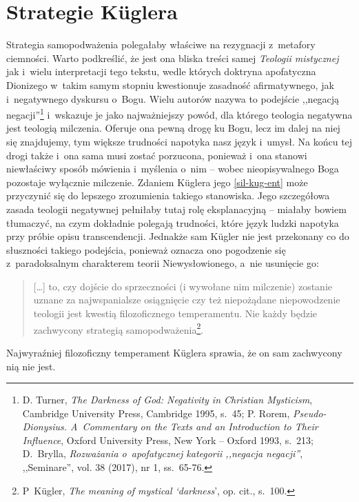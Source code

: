 \section{Strategie Küglera}

Strategia samopodważenia polegałaby właściwe na rezygnacji z~metafory ciemności. Warto podkreślić, że jest ona bliska treści samej \textit{Teologii mistycznej} jak i~wielu interpretacji tego tekstu, wedle których doktryna apofatyczna Dionizego w~takim samym stopniu kwestionuje zasadność afirmatywnego, jak i~negatywnego dyskursu o~Bogu. Wielu autorów nazywa to podejście ,,negacją negacji''\footnote{D. Turner, \textit{The Darkness of God: Negativity in Christian Mysticism}, Cambridge University Press, Cambridge 1995, s.~45; P. Rorem, \textit{Pseudo-Dionysius. A~Commentary on the Texts and an Introduction to Their Influence}, Oxford University Press, New York -- Oxford 1993, s.~213; D.~Brylla, \textit{Rozważania o~apofatycznej kategorii ,,negacja negacji''}, ,,Seminare'', vol. 38 (2017), nr 1, ss.~65-76.} i~wskazuje je jako najważniejszy powód, dla którego teologia negatywna jest teologią milczenia. Oferuje ona pewną drogę ku Bogu, lecz im dalej na niej się znajdujemy, tym większe trudności napotyka nasz język i~umysł. Na końcu tej drogi także i~ona sama musi zostać porzucona, ponieważ i~ona stanowi niewłaściwy sposób mówienia i~myślenia o~nim -- wobec nieopisywalnego Boga pozostaje wyłącznie milczenie. Zdaniem Küglera jego \ref{sil-kug-ent} może przyczynić się do lepszego zrozumienia takiego stanowiska. Jego szczegółowa zasada teologii negatywnej pełniłaby tutaj rolę eksplanacyjną -- miałaby bowiem tłumaczyć, na czym dokładnie polegają trudności, które język ludzki napotyka przy próbie opisu transcendencji. Jednakże sam Kügler nie jest przekonany co do słuszności takiego podejścia, ponieważ oznacza ono pogodzenie się z~paradoksalnym charakterem teorii Niewysłowionego, a~nie usunięcie go:

\begin{quote}
[\ldots] to, czy dojście do sprzeczności (i wywołane nim milczenie) zostanie uznane za najwspanialsze osiągnięcie czy też niepożądane niepowodzenie teologii jest kwestią filozoficznego temperamentu. Nie każdy będzie zachwycony strategią samopodważenia\footnote{P~Kügler, \textit{The meaning of mystical ‘darkness}', op. cit., s.~100.}.
\end{quote}
Najwyraźniej filozoficzny temperament Küglera sprawia, że on sam zachwycony nią nie jest.

